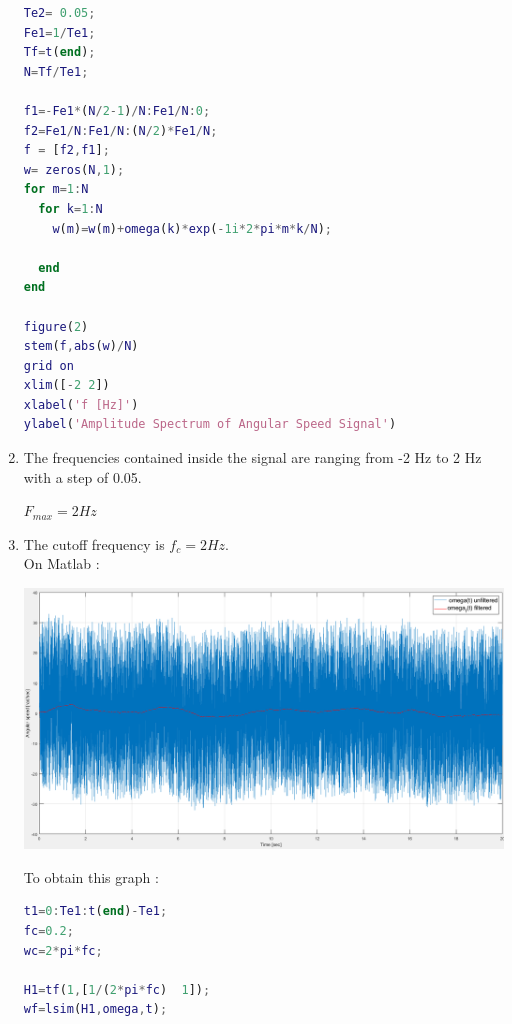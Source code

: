 \documentclass[a4paper,12pt]{article}
\begin{document}
\begin{enumerate}[label={\color{blue}\arabic*)}]
\begin{multicols}{2}
    \begin{lstlisting}[style=Matlab-editor,language=Matlab, basicstyle=\small\ttfamily]
% Plot of the DFT of omega(t)
Te2= 0.05; 
Fe1=1/Te1;
Tf=t(end);
N=Tf/Te1;

f1=-Fe1*(N/2-1)/N:Fe1/N:0;
f2=Fe1/N:Fe1/N:(N/2)*Fe1/N;
f = [f2,f1];
w= zeros(N,1);
for m=1:N
  for k=1:N
    w(m)=w(m)+omega(k)*exp(-1i*2*pi*m*k/N);
  
  end
end

figure(2)
stem(f,abs(w)/N)
grid on
xlim([-2 2])
xlabel('f [Hz]')
ylabel('Amplitude Spectrum of Angular Speed Signal')
        \end{lstlisting}

    \end{multicols}

    \item
    The frequencies contained inside the signal are ranging from -2 Hz to 2 Hz with a step of 0.05.

    \(F_{max} = 2 Hz\)
    \newpage

    \item
    The cutoff frequency is \(f_c = 2 Hz\). \\
    On Matlab :

    \begin{center}
        \includegraphics[scale=0.35]{Images/Omega_Filtered.png}
        \label{Figure3}
    \end{center}

    To obtain this graph :

    \begin{lstlisting}[style=Matlab-editor,language=Matlab, basicstyle=\small\ttfamily]
% filter design
t1=0:Te1:t(end)-Te1;
fc=0.2;
wc=2*pi*fc;

H1=tf(1,[1/(2*pi*fc)  1]);
wf=lsim(H1,omega,t);


\end{lstlisting}
\end{enumerate}
\end{document}
